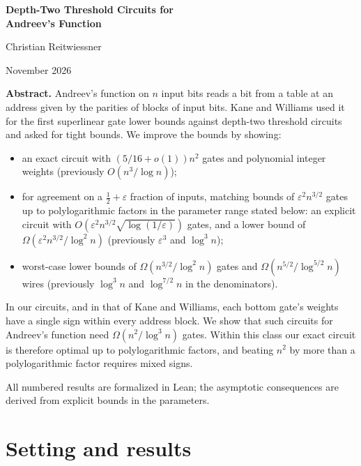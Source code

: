 \documentclass[11pt,letterpaper]{article}
\theoremstyle{remark}
\newcommand{\sect}[1]{\section{\texorpdfstring{\color{ink}#1}{#1}}}
\begin{document}
\thispagestyle{empty}
{\raggedright\color{ink}\LARGE\bfseries Depth-Two Threshold Circuits for\\[0.15em]
Andreev's Function\par}
\vspace{0.5em}
{\large Christian Reitwiessner\par}
{\small November 2026\par}
\vspace{0.8em}

\begin{keybox}
\textbf{Abstract.} Andreev's function on $n$ input bits reads a bit from a
table at an address given by the parities of blocks of input bits. Kane and
Williams used it for the first superlinear gate lower bounds against
depth-two threshold circuits and asked for tight bounds. We improve the bounds by showing:
\begin{itemize}
\item an exact circuit with $(5/16+o(1))n^2$ gates and polynomial integer
      weights (previously $O(n^3/\log n)$);
\item for agreement on a $\tfrac12+\varepsilon$ fraction of inputs, matching
      bounds of $\varepsilon^2n^{3/2}$ gates up to polylogarithmic factors
      in the parameter range stated below:
      an explicit circuit with $O(\varepsilon^2n^{3/2}\sqrt{\log(1/\varepsilon)})$
      gates, and a lower bound of $\Omega(\varepsilon^2n^{3/2}/\log^2n)$
      (previously $\varepsilon^3$ and $\log^3n$);
\item worst-case lower bounds of $\Omega(n^{3/2}/\log^2 n)$ gates and
      $\Omega(n^{5/2}/\log^{5/2}n)$ wires (previously $\log^3 n$ and
      $\log^{7/2}n$ in the denominators).
\end{itemize}
In our circuits, and in that of Kane and Williams, each bottom gate's weights
have a single sign within every address block. We show that such circuits
for Andreev's function need $\Omega(n^2/\log^3n)$ gates. Within this class our
exact circuit is therefore optimal up to polylogarithmic factors, and beating
$n^2$ by more than a polylogarithmic factor requires mixed signs.

All numbered results are formalized in Lean; the asymptotic consequences
are derived from explicit bounds in the parameters.
\end{keybox}

\sect{Setting and results}
\end{document}
